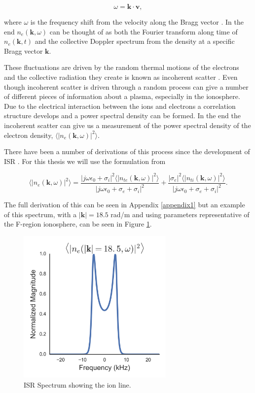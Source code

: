 \begin{equation}
\label{eqn:dop1}
\omega=\mathbf{k} \cdot \mathbf{v},
\end{equation}

\noindent where $\omega$ is the frequency shift from the velocity along the Bragg vector \cite{sheffield2010}. In the end $n_e(\mathbf{k}, \omega)$ can be thought of as both the Fourier transform along time of $n_e(\mathbf{k},t)$ and the collective Doppler spectrum from the density at a specific Bragg vector $\mathbf{k}$.

These fluctuations are driven by the random thermal motions of the electrons and the collective radiation they create is known as incoherent scatter \cite{kudeki:milla:1}. Even though incoherent scatter is driven through a random process can give a number of different pieces of information about a plasma, especially in the ionosphere. Due to the electrical interaction between the ions and electrons a correlation structure develops and a power spectral density can be formed. In the end the incoherent scatter can give us a measurement of the power spectral density of the electron density, $\langle \left|n_e(\mathbf{k},\omega)\right|^2\rangle$.

There have been a number of derivations of this process since the development of ISR \cite{dougherty:farley1960,farleydougherty:ISR2,doughteryfarley:ISR3,hagfors1961}. For this thesis we will use the formulation from  \cite{kudeki:milla:1,kudeki:milla:2,Kudeki:2006kx}


\begin{equation}
\label{eq:mainspeceq:body}
\langle \left|n_e(\mathbf{k},\omega)\right|^2\rangle = \frac{|j\omega\epsilon_0 + \sigma_i|^2 \langle |n_{te}(\mathbf{k},\omega)|^2\rangle}{|j\omega\epsilon_0 +\sigma_e+\sigma_i|^2} + \frac{| \sigma_e|^2 \langle |n_{ti}(\mathbf{k},\omega)|^2\rangle}{|j\omega\epsilon_0 +\sigma_e+\sigma_i|^2}.
\end{equation}

\noindent The full derivation of this can be seen in Appendix \ref{appendix1} but an example of this spectrum, with a $|\mathbf{k}|=18.5$ rad/m and using parameters representative of the F-region ionosphere, can be seen in Figure \ref{fig:ispecch2}. 

\begin{figure}[!t]
\centering
\includegraphics[width=3in]{Specion}
\caption{ISR Spectrum showing the ion line.}
\label{fig:ispecch2}
\end{figure}

